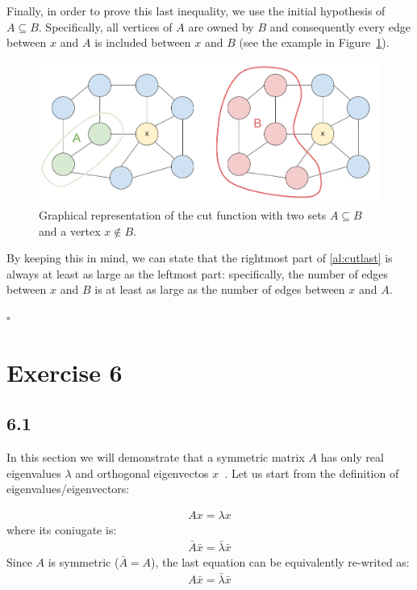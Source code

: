 \documentclass[12pt,a4paper]{article}
\newcommand*{\QEDB}{\hfill\ensuremath{\square}}%
\begin{document}
Finally, in order to prove this last inequality, we use the initial hypothesis of $A \subseteq B$.
Specifically, all vertices of $A$ are owned by $B$ and consequently every edge between $x$ and $A$ is included between $x$ and $B$ (see the example in Figure~\ref{fig:graphAB}).
\begin{figure}[t]
\centering
\includegraphics[scale=0.5]{sub.pdf}
\caption{Graphical representation of the cut function with two sets $A \subseteq B$ and a vertex $x \not\in B$.}\label{fig:graphAB}
\end{figure} By keeping this in mind, we can state that the rightmost part of \eqref{al:cutlast} is always at least as large as the leftmost part: specifically, the number of edges between $x$ and $B$ is at least as large as the number of edges between $x$ and $A$.

\QEDB


\section*{Exercise 6}
\subsection*{6.1}

In this section we will demonstrate that a symmetric matrix $A$ has only real eigenvalues $\lambda$ and orthogonal eigenvectos $x$~\cite{eigen}. Let us start from the definition of eigenvalues/eigenvectors:

\begin{align}\label{al:first}
A x = \lambda x
\end{align}
where its coniugate is:
\begin{align}\label{al:eigensym}
\bar{A} \bar{x} = \bar{\lambda} \bar{x}
\end{align}
Since $A$ is symmetric ($\bar{A} = A$), the last equation can be equivalently re-writed as:
\begin{align}\label{al:eigencmp}
A \bar{x} = \bar{\lambda} \bar{x}
\end{align}
\end{document}
